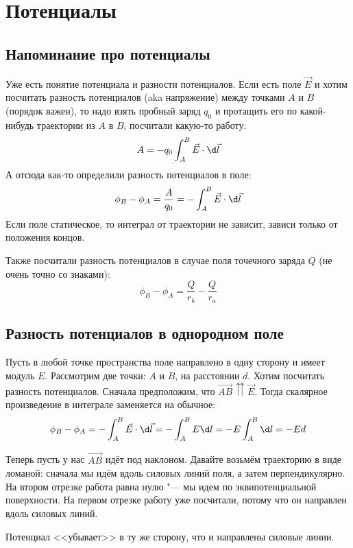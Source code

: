\chapter{Потенциалы}

\section{Напоминание про потенциалы}
  Уже есть понятие потенциала и разности потенциалов.
  Если есть поле $\vec E$ и хотим посчитать разность потенциалов (aka напряжение) между точками $A$ и $B$ (порядок важен),
  то надо взять пробный заряд $q_0$ и протащить его по какой-нибудь траектории из $A$ в $B$,
  посчитали какую-то работу:
  \[A = -q_0 \int_A^B \vec E \cdot \d\vec l\]
  А отсюда как-то определили разность потенциалов в поле:
  \[\phi_B-\phi_A = \frac{A}{q_0} = -\int_A^B \vec E \cdot \d \vec l\]
  Если поле статическое, то интеграл от траектории не зависит, зависи только от положения концов.

  Также посчитали разность потенциалов в случае поля точечного заряда $Q$ (не очень точно со знаками):
  \[ \phi_B-\phi_A = \frac{Q}{r_b} - \frac{Q}{r_a}\]

\section{Разность потенциалов в однородном поле}
  Пусть в любой точке пространства поле направлено в одну сторону и имеет модуль $E$.
  Рассмотрим две точки: $A$ и $B$, на расстоянии $d$.
  Хотим посчитать разность потенциалов.
  Сначала предположим, что $\vec{AB} \upuparrows \vec E$.
  Тогда скалярное произведение в интеграле заменяется на обычное:
  \[\phi_B - \phi_A = -\int_A^B \vec E \cdot \d \vec l = -\int_A^B E \d l = -E \int_A^B \d l = -Ed \]

  Теперь пусть у нас $\vec{AB}$ идёт под наклоном.
  Давайте возьмём траекторию в виде ломаной: сначала мы идём вдоль силовых линий поля, а затем перпендикулярно.
  На втором отрезке работа равна нулю "--- мы идем по эквипотенциальной поверхности.
  На первом отрезке работу уже посчитали, потому что он направлен вдоль силовых линий.
  \begin{Rem}
    Потенциал <<убывает>> в ту же сторону, что и направлены силовые линии.
  \end{Rem}

